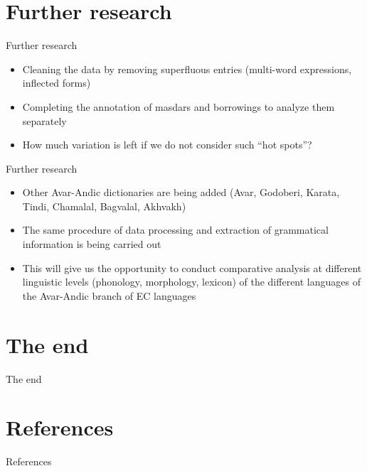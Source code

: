 \section{Further research}

\begin{frame}{Further research}
\begin{itemize}
    \item Cleaning the data by removing superfluous entries (multi-word expressions, inflected forms)
    \item Completing the annotation of masdars and borrowings to analyze them separately
    \item How much variation is left if we do not consider such ``hot spots''?
\end{itemize}
\end{frame}

\begin{frame}{Further research}
\begin{itemize}
    \item Other Avar-Andic dictionaries are being added (Avar, Godoberi, Karata, Tindi, Chamalal, Bagvalal, Akhvakh)
    \item The same procedure of data processing and extraction of grammatical information is being carried out
    \item This will give us the opportunity to conduct comparative analysis at different linguistic levels (phonology, morphology, lexicon) of the different languages of the Avar-Andic branch of EC languages
\end{itemize}
\end{frame}

\section{The end}
\begin{frame}{The end}
\begin{figure}[h]
\centering
{}
\end{figure}
\end{frame}

\section{References}
\begin{frame}[allowframebreaks]{References}
\printbibliography
\end{frame}

